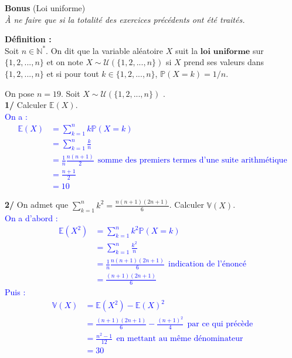 \documentclass[a4paper,12pt]{article}
\newcommand{\E}{\mathbb{E}}
\newcommand{\prob}{\mathbb{P}}
\newcommand{\n}{\mathbb{N}}
\begin{document}
\textbf{Bonus} (Loi uniforme) \\
\textit{À ne faire que si la totalité des exercices précédents ont été traités.}

\begin{tcolorbox}[colframe=black, colback=white, sharp corners, width=\textwidth, boxrule=0.5mm]
\textbf{Définition :}\\
Soit $n \in \n^*$. On dit que la variable aléatoire $X$ suit la $\textbf{loi uniforme}$ sur $\{1,2,...,n\}$ et on note $X \sim \mathcal{U} (\{1,2,...,n\})$ si $X$ prend ses valeurs dans $\{1,2,...,n\}$ et si pour tout $k \in \{1,2,...,n\}$, $\prob (X=k) = 1/n$. 
\end{tcolorbox}

On pose $n=19$. Soit $X \sim \mathcal{U} (\{1,2,...,n \})$ . \\

\textbf{1/} Calculer $\E (X)$. \\ 

\textcolor{blue}{On a :
\begin{align*}
\E (X) & = \sum_{k=1}^n k \prob (X=k) \\
& = \sum_{k=1}^n \frac{k}{n} \\
& = \frac{1}{n} \frac{n(n+1)}{2} \ \ \text{somme des premiers termes d'une suite arithmétique} \\
& = \frac{n+1}{2} \\
& = 10
\end{align*}}

\textbf{2/} On admet que $\sum_{k=1}^n k^2= \frac{n(n+1)(2n+1)}{6}$. Calculer $\mathbb{V}(X)$. \\

\textcolor{blue}{
On a d'abord :
\begin{align*}
\E(X^2) & = \sum_{k=1}^n k^2 \prob (X=k) \\
& = \sum_{k=1}^n \frac{k^2}{n} \\
& = \frac{1}{n} \frac{n(n+1)(2n+1)}{6} \ \ \text{indication de l'énoncé} \\
& = \frac{(n+1)(2n+1)}{6}
\end{align*}
Puis :
\begin{align*}
\mathbb{V} (X) & = \E (X^2) - \E(X)^2 \\
& = \frac{(n+1)(2n+1)}{6} - \frac{(n+1)^2}{4} \ \ \text{par ce qui précède} \\
& = \frac{n^2-1}{12} \ \ \text{en mettant au même dénominateur} \\
& = 30
\end{align*}}
\end{document}
